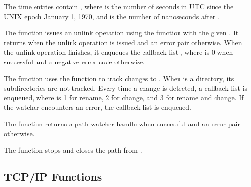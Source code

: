 The time entries contain , where
 is the number of seconds in UTC since the UNIX epoch January
1, 1970, and  is the number of nanoseconds after .

\begin{function}
\end{function}

The  function issues an unlink operation using the
 function with the given . It returns
 when the unlink operation is issued and an error pair
otherwise. When the unlink operation finishes, it enqueues the
callback list , where 
is 0 when successful and a negative error code otherwise.

\begin{function}
\end{function}

The  function uses the
 function to track changes to
. When  is a directory, its subdirectories are not
tracked. Every time a change is detected, a callback list
 is enqueued, where
 is 1 for rename, 2 for change, and 3 for rename and
change.  If the watcher encounters an error, the callback list
 is enqueued.

The  function returns a path watcher handle
when successful and an error pair otherwise.

\begin{function}
\end{function}

The  function stops and closes the
path  from .

\subsection {TCP/IP Functions}

\begin{function}
\end{function}

